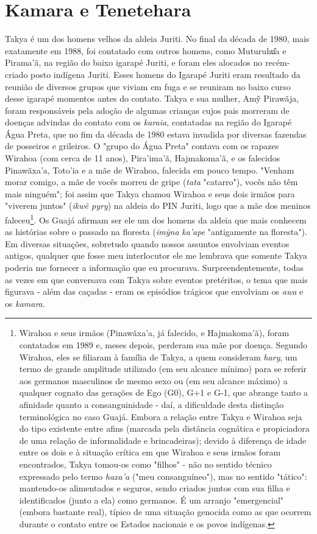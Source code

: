 \section{Kamara e Tenetehara}\label{kamara-e-tenetehara}

Takya é um dos homens velhos da aldeia Juriti. No final da década de
1980, mais exatamente em 1988, foi contatado com outros homens, como
Muturuhu͂a e Pirama'ã, na região do baixo igarapé Juriti, e foram eles
alocados no recém-criado posto indígena Juriti. Esses homens do Igarapé
Juriti eram resultado da reunião de diversos grupos que viviam em fuga e
se reuniram no baixo curso desse igarapé momentos antes do contato.
Takya e sua mulher, Amỹ Pirawãja, foram responsáveis pela adoção de
algumas crianças cujos pais morreram de doenças advindas do contato com
os \emph{karaia}, contatadas na região do Igarapé Água Preta, que no fim
da década de 1980 estava invadida por diversas fazendas de posseiros e
grileiros. O "grupo do Água Preta" contava com os rapazes Wirahoa (com
cerca de 11 anos), Pira'ima'ã, Hajmakoma'ã, e os falecidos Pinawãxa'a,
Toto'ia e a mãe de Wirahoa, falecida em pouco tempo. "Venham morar
comigo, a mãe de vocês morreu de gripe (\emph{tata} "catarro"), vocês
não têm mais ninguém"; foi assim que Takya chamou Wirahoa e seus dois
irmãos para "viverem juntos" (\emph{ikwẽ pyry}) na aldeia do PIN Juriti,
logo que a mãe dos meninos faleceu\footnote{Wirahoa e seus irmãos
  (Pinawãxa'a, já falecido, e Hajmakoma'ã), foram contatados em 1989 e,
  meses depois, perderam sua mãe por doença. Segundo Wirahoa, eles se
  filiaram à família de Takya, a quem consideram \emph{hary}, um termo
  de grande amplitude utilizado (em seu alcance mínimo) para se referir
  aos germanos masculinos de mesmo sexo ou (em seu alcance máximo) a
  qualquer cognato das gerações de Ego (G0), G+1 e G-1, que abrange
  tanto a afinidade quanto a consanguinidade - daí, a dificuldade desta
  distinção terminológica no caso Guajá. Embora a relação entre Takya e
  Wirahoa seja do tipo existente entre afins (marcada pela distância
  cognática e propiciadora de uma relação de informalidade e
  brincadeiras); devido à diferença de idade entre os dois e à situação
  crítica em que Wirahoa e seus irmãos foram encontrados, Takya tomou-os
  como "filhos" - não no sentido técnico expressado pelo termo
  \emph{haxa'a} ("meu consanguíneo"), mas no sentido "tático":
  mantendo-os alimentados e seguros, sendo criados juntos com sua filha
  e identificados (junto a ela) como germanos. É um arranjo
  "emergencial" (embora bastante real), típico de uma situação genocida
  como as que ocorrem durante o contato entre os Estados nacionais e os
  povos indígenas.}. Os Guajá afirmam ser ele um dos homens da aldeia
que mais conhecem as histórias sobre o passado na floresta (\emph{imỹna}
\emph{ka'ape} "antigamente na floresta"). Em diversas situações,
sobretudo quando nossos assuntos envolviam eventos antigos, qualquer que
fosse meu interlocutor ele me lembrava que somente Takya poderia me
fornecer a informação que eu procurava. Surpreendentemente, todas as
vezes em que conversava com Takya sobre eventos pretéritos, o tema que
mais figurava - além das caçadas - eram os episódios trágicos que
envolviam os \emph{awa} e os \emph{kamara}.

